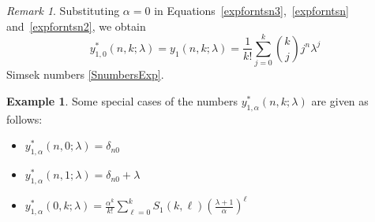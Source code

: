 \documentclass{amsart}
\numberwithin{equation}{section}
\theoremstyle{definition}
\newtheorem{example}[theorem]{Example}
\theoremstyle{remark}
\newtheorem{remark}[theorem]{Remark}
\begin{document}
\begin{remark}
Substituting  $\alpha=0$ in Equations~\eqref{expforntsn3},~\eqref{expforntsn} and~\eqref{expforntsn2}, we obtain
$$y_{1, 0}^{*}(n,k;\lambda)=y_{1}(n,k;\lambda)=\frac{1}{k!}\sum_{j=0}^{k}\binom{k}{j}j^n\lambda^j$$
Simsek numbers \eqref{SnumbersExp}.
\end{remark}
\begin{example} Some special cases of the numbers $y_{1, \alpha}^{*}(n,k;\lambda)$ are given as follows:
\begin{itemize}
  \item $y_{1,\alpha}^{*}(n,0;\lambda)=\delta_{n0}$
  \item $y_{1,\alpha}^{*}(n,1;\lambda)=\delta_{n0}+\lambda$
  \item $y_{1,\alpha}^{*}(0,k;\lambda)=\frac{\alpha^k}{k!}\sum\limits_{\ell=0}^{k}S_{1}(k,\ell)\left(\frac{\lambda+1}{\alpha}\right)^{\ell}$
\end{itemize}
\end{example}
\end{document}

